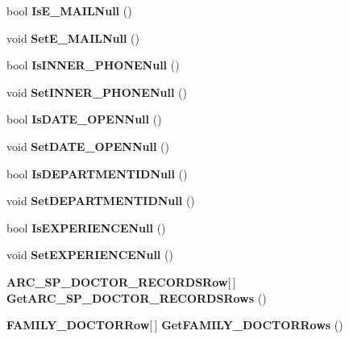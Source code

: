 \begin{CompactItemize}
\item 
bool \textbf{IsE\_\-MAILNull} ()\label{class_automatic_medical_system_1_1_data_set1_1_1_d_o_c_t_o_r_s_row_85a866cfc13556eb9a17f973a8cbe9ef}

\item 
void \textbf{SetE\_\-MAILNull} ()\label{class_automatic_medical_system_1_1_data_set1_1_1_d_o_c_t_o_r_s_row_ffa5e92d4bb1bb03874632c3904bff09}

\item 
bool \textbf{IsINNER\_\-PHONENull} ()\label{class_automatic_medical_system_1_1_data_set1_1_1_d_o_c_t_o_r_s_row_93378e033886527a4e742fffddc48953}

\item 
void \textbf{SetINNER\_\-PHONENull} ()\label{class_automatic_medical_system_1_1_data_set1_1_1_d_o_c_t_o_r_s_row_9c31becb112ae5c865592fca719a3d61}

\item 
bool \textbf{IsDATE\_\-OPENNull} ()\label{class_automatic_medical_system_1_1_data_set1_1_1_d_o_c_t_o_r_s_row_a32511ca7eeef6dce89a1e5773761b57}

\item 
void \textbf{SetDATE\_\-OPENNull} ()\label{class_automatic_medical_system_1_1_data_set1_1_1_d_o_c_t_o_r_s_row_6bc36cdd3b6ab2bf7c5b8de8c49f7cc1}

\item 
bool \textbf{IsDEPARTMENTIDNull} ()\label{class_automatic_medical_system_1_1_data_set1_1_1_d_o_c_t_o_r_s_row_efe6fb786317a012a6d17bd1e6d32848}

\item 
void \textbf{SetDEPARTMENTIDNull} ()\label{class_automatic_medical_system_1_1_data_set1_1_1_d_o_c_t_o_r_s_row_e72a1d6030063b19ae89f9d52a927000}

\item 
bool \textbf{IsEXPERIENCENull} ()\label{class_automatic_medical_system_1_1_data_set1_1_1_d_o_c_t_o_r_s_row_3747b2853c01743765dc9bd4a4bc4ef0}

\item 
void \textbf{SetEXPERIENCENull} ()\label{class_automatic_medical_system_1_1_data_set1_1_1_d_o_c_t_o_r_s_row_082dc2c3d17229eced3a07505a33f1a1}

\item 
{\bf ARC\_\-SP\_\-DOCTOR\_\-RECORDSRow}[$\,$] \textbf{GetARC\_\-SP\_\-DOCTOR\_\-RECORDSRows} ()\label{class_automatic_medical_system_1_1_data_set1_1_1_d_o_c_t_o_r_s_row_f6aa9e7561be8bceb0d881a2f4d489ae}

\item 
{\bf FAMILY\_\-DOCTORRow}[$\,$] \textbf{GetFAMILY\_\-DOCTORRows} ()\label{class_automatic_medical_system_1_1_data_set1_1_1_d_o_c_t_o_r_s_row_97578d33f7d89ca3232f8151707a5e56}

\end{CompactItemize}
